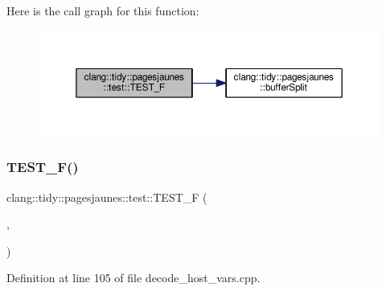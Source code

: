Here is the call graph for this function\+:
\nopagebreak
\begin{figure}[H]
\begin{center}
\leavevmode
\includegraphics[width=350pt]{namespaceclang_1_1tidy_1_1pagesjaunes_1_1test_a9754e282dd6f8e30e4a45e90cac8e610_cgraph}
\end{center}
\end{figure}
\mbox{\label{namespaceclang_1_1tidy_1_1pagesjaunes_1_1test_af9355848f58738817b5a349ac368a6a9}} 
\subsubsection{\texorpdfstring{T\+E\+S\+T\+\_\+\+F()}{TEST\_F()}\hspace{0.1cm}{\footnotesize\ttfamily [28/57]}}
{\footnotesize\ttfamily clang\+::tidy\+::pagesjaunes\+::test\+::\+T\+E\+S\+T\+\_\+F (\begin{DoxyParamCaption}\item[{\hyperlink{classclang_1_1tidy_1_1pagesjaunes_1_1test_1_1_decode_host_vars_test}{Decode\+Host\+Vars\+Test}}]{,  }\item[{Decode\+Host\+Vars\+Basic2}]{ }\end{DoxyParamCaption})}



Definition at line 105 of file decode\+\_\+host\+\_\+vars.\+cpp.

